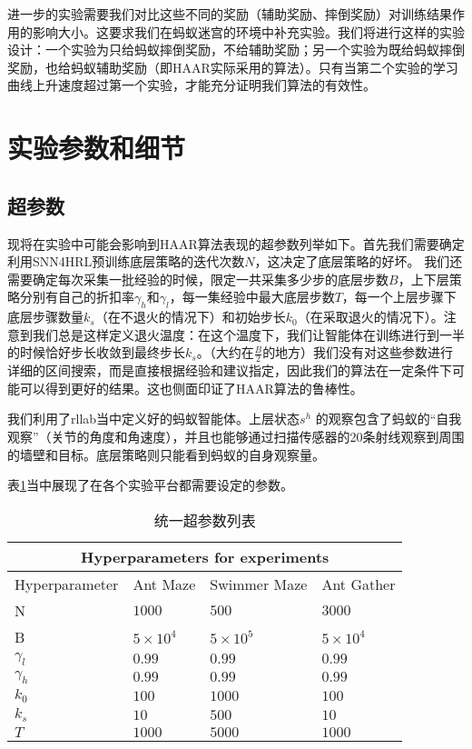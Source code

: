 进一步的实验需要我们对比这些不同的奖励（辅助奖励、摔倒奖励）对训练结果作用的影响大小。这要求我们在蚂蚁迷宫的环境中补充实验。我们将进行这样的实验设计：一个实验为只给蚂蚁摔倒奖励，不给辅助奖励；另一个实验为既给蚂蚁摔倒奖励，也给蚂蚁辅助奖励（即HAAR实际采用的算法）。只有当第二个实验的学习曲线上升速度超过第一个实验，才能充分证明我们算法的有效性。

\section{实验参数和细节}\label{params}
\subsection{超参数}
现将在实验中可能会影响到HAAR算法表现的超参数列举如下。首先我们需要确定利用SNN4HRL\cite{SNN4hrl}预训练底层策略的迭代次数$N$，这决定了底层策略的好坏。 我们还需要确定每次采集一批经验的时候，限定一共采集多少步的底层步数$B$，上下层策略分别有自己的折扣率$\gamma_h$和$\gamma_l$，每一集经验中最大底层步数$T$，每一个上层步骤下底层步骤数量$k_s$（在不退火的情况下）和初始步长$k_0$（在采取退火的情况下）。注意到我们总是这样定义退火温度：在这个温度下，我们让智能体在训练进行到一半的时候恰好步长收敛到最终步长$k_s$。（大约在$\frac{B}{2}$的地方）我们没有对这些参数进行详细的区间搜索，而是直接根据经验和建议指定，因此我们的算法在一定条件下可能可以得到更好的结果。这也侧面印证了HAAR算法的鲁棒性。

我们利用了rllab\cite{benchmarking_RL}当中定义好的蚂蚁智能体。上层状态$s^h$ 的观察包含了蚂蚁的``自我观察''（关节的角度和角速度），并且也能够通过扫描传感器的20条射线观察到周围的墙壁和目标。底层策略则只能看到蚂蚁的自身观察量。

表\ref{table:hyperparamters}当中展现了在各个实验平台都需要设定的参数。

\begin{table}
\caption{统一超参数列表}
\begin{tabular}[c]{ |p{3cm}||p{3cm}|p{3cm}|p{3cm}|  }
 \hline 
 \multicolumn{4}{|c|}{Hyperparameters for experiments} \\
 \hline
 Hyperparameter & Ant Maze & Swimmer Maze & Ant Gather \\
 \hline
 N  & $1000$ & $500$ & $3000$\\
 B  & $5\times 10^4$ & $5\times10^5$  & $5\times10^4$ \\
 $\gamma_l$ & $0.99$ & $0.99$ & $0.99$\\
 $\gamma_h$ & $0.99$ & $0.99$ & $0.99$\\
 $k_0$ & $100$  & $1000$ & $100$\\
 $k_s$ & $10$  & $500$  & $10$\\
 $T$ & $1000$  & $5000$ & $1000$\\
 \hline
\end{tabular}
\label{table:hyperparamters}
\end{table}

